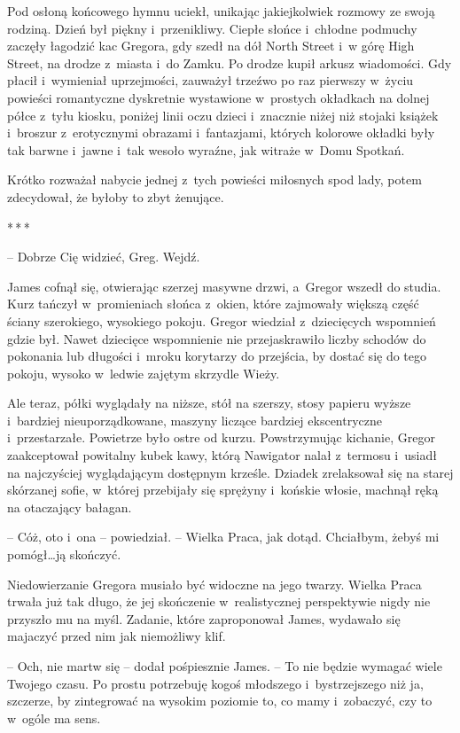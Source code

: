 \documentclass[oneside,polish,12pt,sfheadings]{mwbk}
\newcommand{\threeast}{\bigskip\par\centerline{*\,*\,*}\medskip\par}%
\begin{document}
Pod osłoną końcowego hymnu uciekł, unikając jakiejkolwiek rozmowy ze
swoją rodziną. Dzień był piękny i~przenikliwy. Ciepłe słońce i~chłodne
podmuchy zaczęły łagodzić kac Gregora, gdy szedł na dół North Street i~w
górę High Street, na drodze z~miasta i~do Zamku. Po drodze kupił arkusz
wiadomości. Gdy płacił i~wymieniał uprzejmości, zauważył trzeźwo po raz
pierwszy w~życiu powieści romantyczne dyskretnie wystawione w~prostych
okładkach na dolnej półce z~tyłu kiosku, poniżej linii oczu dzieci i~znacznie niżej niż stojaki książek i~broszur z~erotycznymi obrazami i~fantazjami, których kolorowe okładki były tak barwne i~jawne i~tak
wesoło wyraźne, jak witraże w~Domu Spotkań.

Krótko rozważał nabycie jednej z~tych powieści miłosnych spod lady,
potem zdecydował, że byłoby to zbyt żenujące.

\threeast

-- Dobrze Cię widzieć, Greg. Wejdź.

James cofnął się, otwierając szerzej masywne drzwi, a~Gregor wszedł do
studia. Kurz tańczył w~promieniach słońca z~okien, które zajmowały
większą część ściany szerokiego, wysokiego pokoju. Gregor wiedział z~dziecięcych wspomnień gdzie był. Nawet dziecięce wspomnienie nie
przejaskrawiło liczby schodów do pokonania lub długości i~mroku
korytarzy do przejścia, by dostać się do tego pokoju, wysoko w~ledwie
zajętym skrzydle Wieży.

Ale teraz, półki wyglądały na niższe, stół na szerszy, stosy papieru
wyższe i~bardziej nieuporządkowane, maszyny liczące bardziej
ekscentryczne i~przestarzałe. Powietrze było ostre od kurzu.
Powstrzymując kichanie, Gregor zaakceptował powitalny kubek kawy, którą
Nawigator nalał z~termosu i~usiadł na najczyściej wyglądającym dostępnym
krześle. Dziadek zrelaksował się na starej skórzanej sofie, w~której
przebijały się sprężyny i~końskie włosie, machnął ręką na otaczający
bałagan.

-- Cóż, oto i~ona -- powiedział. -- Wielka Praca, jak dotąd. Chciałbym,
żebyś mi pomógł\ldots ją skończyć.

Niedowierzanie Gregora musiało być widoczne na jego twarzy. Wielka Praca
trwała już tak długo, że jej skończenie w~realistycznej perspektywie
nigdy nie przyszło mu na myśl. Zadanie, które zaproponował James,
wydawało się majaczyć przed nim jak niemożliwy klif.

-- Och, nie martw się -- dodał pośpiesznie James. -- To nie będzie wymagać
wiele Twojego czasu. Po prostu potrzebuję kogoś młodszego i~bystrzejszego niż ja, szczerze, by zintegrować na wysokim poziomie to,
co mamy i~zobaczyć, czy to w~ogóle ma sens.
\end{document}

